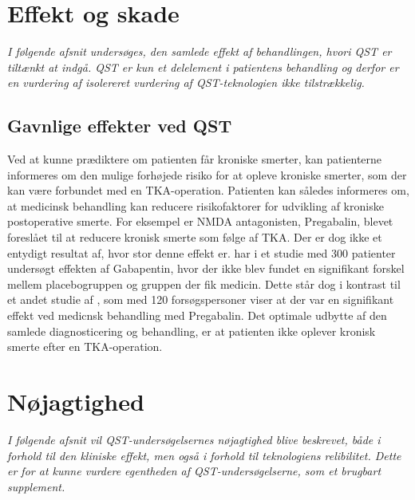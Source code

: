 \section{Effekt og skade}
\textit{I følgende afsnit undersøges, den samlede effekt af behandlingen, hvori QST er tiltænkt at indgå. QST er kun et delelement i patientens behandling og derfor er en vurdering af isolereret vurdering af QST-teknologien ikke tilstrækkelig.}

\subsection{Gavnlige effekter ved QST} 
Ved at kunne prædiktere om patienten får kroniske smerter, kan patienterne informeres om den mulige forhøjede risiko for at opleve kroniske smerter, som der kan være forbundet med en TKA-operation. Patienten kan således informeres om, at medicinsk behandling kan reducere risikofaktorer for udvikling af kroniske postoperative smerte.%
For eksempel er NMDA antagonisten, Pregabalin, blevet foreslået til at reducere kronisk smerte som følge af TKA. Der er dog ikke et entydigt resultat af, hvor stor denne effekt er.  har i et studie med 300 patienter undersøgt effekten af Gabapentin, hvor der ikke blev fundet en signifikant forskel mellem placebogruppen og gruppen der fik medicin. Dette står dog i kontrast til et andet studie af , som med 120 forsøgspersoner viser at der var en signifikant effekt ved medicnsk behandling med Pregabalin. 
Det optimale udbytte af den samlede diagnosticering og behandling, er at patienten ikke oplever kronisk smerte efter en TKA-operation. %


\section{Nøjagtighed}
\textit{I følgende afsnit vil QST-undersøgelsernes nøjagtighed blive beskrevet, både i forhold til den kliniske effekt, men også i forhold til teknologiens relibilitet. Dette er for at kunne vurdere egentheden af QST-undersøgelserne, som et brugbart supplement.}

